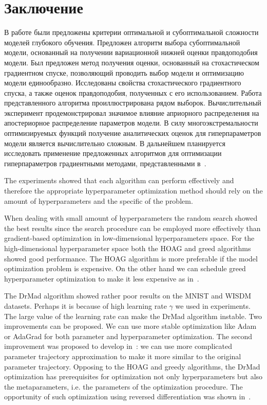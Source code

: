 
\chapter*{Заключение}
В работе были предложены критерии оптимальной и субоптимальной сложности моделей глубокого обучения. Предложен алгоритм выбора субоптимальной модели, основанный на получении вариационной нижней оценки  правдоподобия модели. Был предложен метод получения оценки, основанный на стохастическом градиентном спуске, позволяющий проводить выбор модели и оптимизацию модели единообразно. Исследованы свойства стохастического градиентного спуска, а также оценок правдоподобия, полученных с его использованием. 
Работа представленного алгоритма проиллюстрирована рядом выборок. 
Вычислительный эксперимент продемонстрировал значимое влияние априорного распределения на апостериорное распределение параметров модели. В силу многоэкстремальности оптимизируемых функций получение аналитических оценок для гиперпараметров модели является вычислительно сложным. В дальнейшем  планируется исследовать применение 
предложенных алгоритмов для оптимизации гиперпараметров градиентными методами, представленными в~\cite{hyper}.






The experiments showed that each algorithm can perform effectively and therefore the appropriate hyperparameter optimization method should rely on the amount of hyperparameters and the specific of the problem. 

When dealing with small amount of hyperparameters the random search showed the best results since the search procedure can be employed more effectively than gradient-based optimization in low-dimensional hyperparameters space. For the high-dimensional hyperparameter space both the  HOAG and greed algorithms showed good performance. 
The HOAG algorithm is more preferable if the model optimization problem is expensive. On the other hand we can schedule greed hyperparameter optimization to make it less expensive as in~\cite{greed_hyper}. 

The DrMad algorithm showed rather poor results on the MNIST and WISDM datasets. Perhaps it is because of high learning rate $\gamma$ we used in experiments. The large value of the learning rate can make the DrMad algorithm instable. Two improvements can be proposed. We can use more stable optimization like Adam or AdaGrad for both parameter and hyperparameter optimization. The second improvement was proposed to develop in~\cite{hyper_mad}: we can use more complicated parameter trajectory approximation to make it more similar to the original parameter trajectory. Opposing to the HOAG and greedy algorithms, the DrMad optimization has prerequisites for optimization not only hyperparameters but also the metaparameters, i.e. the parameters  of the optimization procedure. The opportunity of such optimization using reversed differentiation was shown in~\cite{hyper_mad}. 

